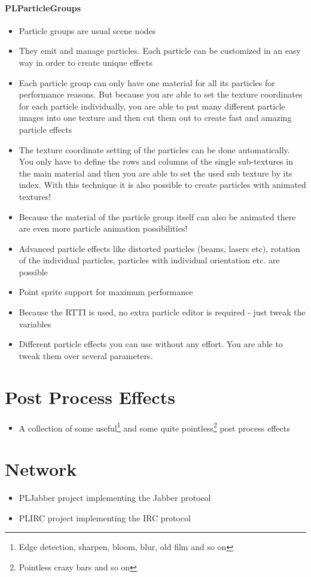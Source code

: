 \paragraph{PLParticleGroups}
\begin{itemize}
\item{Particle groups are usual scene nodes}
\item{They emit and manage particles. Each particle can be customized in an easy way in order to create unique effects}
\item{Each particle group can only have one material for all its particles for performance reasons. But because you are able to set the texture coordinates for each particle individually, you are able to put many different particle images into one texture and then cut them out to create fast and amazing particle effects}
\item{The texture coordinate setting of the particles can be done automatically. You only have to define the rows and columns of the single sub-textures in the main material and then you are able to set the used sub texture by its index. With this technique it is also possible to create particles with animated textures!}
\item{Because the material of the particle group itself can also be animated there are even more particle animation possibilities!}
\item{Advanced particle effects like distorted particles (beams, lasers etc), rotation of the individual particles, particles with individual orientation etc. are possible}
\item{Point sprite support for maximum performance}
\item{Because the \ac{RTTI} is used, no extra particle editor is required - just tweak the variables}
\item{Different particle effects you can use without any effort. You are able to tweak them over several parameters.}
\end{itemize}




\section{Post Process Effects}
\begin{itemize}
\item{A collection of some useful\footnote{Edge detection, sharpen, bloom, blur, old film and so on} and some quite pointless\footnote{Pointless crazy bars and so on} post process effects}
\end{itemize}




\section{Network}
\begin{itemize}
\item{PLJabber project implementing the Jabber protocol}
\item{PLIRC project implementing the IRC protocol}
\end{itemize}
